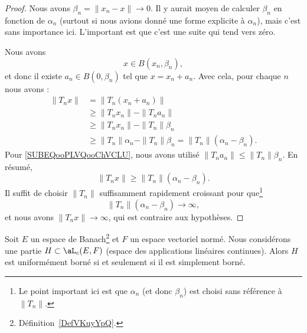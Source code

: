 \begin{proof}
	Nous avons \( \beta_n=\| x_n-x \|\to 0\). Il y aurait moyen de calculer \( \beta_n\) en fonction de \( \alpha_n\) (surtout si nous avions donné une forme explicite à \( \alpha_n\)), mais c'est sans importance ici. L'important est que c'est une suite qui tend vers zéro.

	Nous avons
	\begin{equation}
		x\in B(x_n,\beta_n),
	\end{equation}
	et donc il existe \( a_n\in B(0,\beta_n)\) tel que \( x=x_n+a_n\). Avec cela, pour chaque \( n\) nous avons :
	\begin{subequations}
		\begin{align}
			\| T_nx \| & =\| T_n(x_n+a_n) \|                                                   \\
			           & \geq\| T_nx_n \|-\| T_na_n \|                                         \\
			           & \geq \| T_nx_n \|-\| T_n \|\beta_n    \label{SUBEQooPLVQooChVCLU}     \\
			           & \geq \| T_n \|\alpha_n-\| T_n \|\beta_n =\| T_n \|(\alpha_n-\beta_n).
		\end{align}
	\end{subequations}
	Pour \ref{SUBEQooPLVQooChVCLU}, nous avons utilisé \( \| T_na_n \|\leq \| T_n \|\beta_n\). En résumé,
	\begin{equation}
		\| T_nx \|\geq \| T_n \|(\alpha_n-\beta_n).
	\end{equation}
	Il suffit de choisir \( \| T_n \|\) suffisamment rapidement croissant pour que\footnote{Le point important ici est que \( \alpha_n\) (et donc \( \beta_n\)) est choisi sans référence à \( \| T_n \|\).}
	\begin{equation}
		\| T_n \|(\alpha_n-\beta_n)\to \infty,
	\end{equation}
	et nous avons \( \| T_nx \|\to \infty\), qui est contraire aux hypothèses.
\end{proof}

\begin{theorem} \label{ThoPFBMHBN}
	Soit \( E\) un espace de Banach\footnote{Définition~\ref{DefVKuyYpQ}.} et \( F\) un espace vectoriel normé. Nous considérons une partie \( H\subset \aL_c(E,F)\) (espace des applications linéaires continues). Alors \( H\) est uniformément borné si et seulement si il est simplement borné.
\end{theorem}

